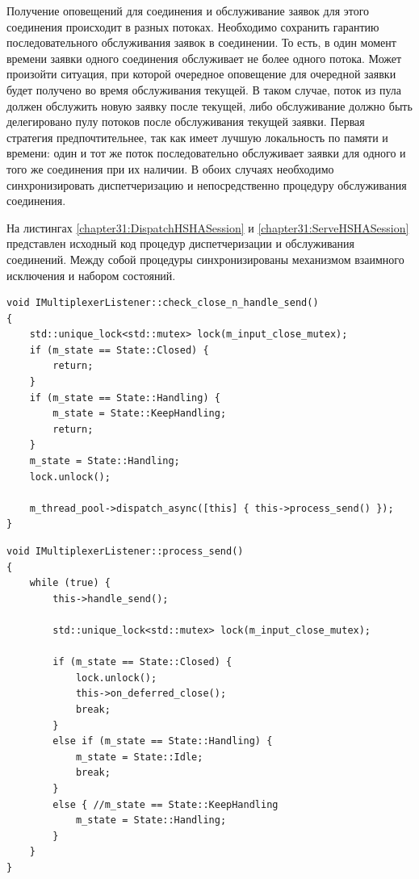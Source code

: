 Получение оповещений для соединения и обслуживание заявок для этого соединения происходит в разных потоках. Необходимо сохранить гарантию последовательного обслуживания заявок в соединении. То есть, в один момент времени заявки одного соединения обслуживает не более одного потока. Может произойти ситуация, при которой очередное оповещение для очередной заявки будет получено во время обслуживания текущей. В таком случае, поток из пула должен обслужить новую заявку после текущей, либо обслуживание должно быть делегировано пулу потоков после обслуживания текущей заявки. Первая стратегия предпочтительнее, так как имеет лучшую локальность по памяти и времени: один и тот же поток последовательно обслуживает заявки для одного и того же соединения при их наличии. В обоих случаях необходимо синхронизировать диспетчеризацию и непосредственно процедуру обслуживания соединения.

На листингах \ref{chapter31:DispatchHSHASession} и \ref{chapter31:ServeHSHASession} представлен исходный код процедур диспетчеризации и обслуживания соединений. Между собой процедуры синхронизированы механизмом взаимного исключения и набором состояний.

\begin{lstlisting}[float=!h,caption={Процедура диспетчеризации обслуживания соединения},label={chapter31:DispatchHSHASession},frame=tlrb]
void IMultiplexerListener::check_close_n_handle_send()
{
    std::unique_lock<std::mutex> lock(m_input_close_mutex);
    if (m_state == State::Closed) {
        return;
    }
    if (m_state == State::Handling) {
        m_state = State::KeepHandling;
        return;
    }
    m_state = State::Handling;
    lock.unlock();

    m_thread_pool->dispatch_async([this] { this->process_send() });
}
\end{lstlisting}

\begin{lstlisting}[float=!h,caption={Процедура обслуживания соединения в мультиплексоре оповещений},label={chapter31:ServeHSHASession},frame=tlrb]
void IMultiplexerListener::process_send()
{
    while (true) {
        this->handle_send();	

        std::unique_lock<std::mutex> lock(m_input_close_mutex);
      
        if (m_state == State::Closed) {
            lock.unlock();
            this->on_deferred_close();
            break;
        }
        else if (m_state == State::Handling) {
            m_state = State::Idle;
            break;
        }
        else { //m_state == State::KeepHandling
            m_state = State::Handling;
        }
    }
}
\end{lstlisting}

